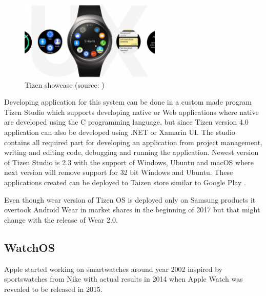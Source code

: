 \begin{figure}[H]
	\begin{centering}
		\includegraphics[width=0.6\textwidth]{img/tizen}
		\par\end{centering}
	\caption{Tizen showcase (source: \cite{NFFAWSW})\label{fig:Tizen}}
	\label{fig05c04}
\end{figure}

Developing application for this system can be done in a custom made program Tizen Studio which supports developing native or Web applications where native are developed using the C programming language, but since Tizen version 4.0 application can also be developed using .NET or Xamarin UI. The studio contains all required part for developing an application from project management, writing and editing code, debugging and running the application. Newest version of Tizen Studio is 2.3 with the support of Windows, Ubuntu and macOS where next version will remove support for 32 bit Windows and Ubuntu. These applications created can be deployed to Taizen store similar to Google Play \cite{TizenDev}.

Even though wear version of Tizen OS is deployed only on Samsung products it overtook Android Wear in market shares in the beginning of 2017 but that might change with the release of Wear 2.0. 

\subsection{WatchOS}\label{sec:WatchOS}
Apple started working on smartwatches around year 2002 inspired by sportswatches from Nike with actual results in 2014 when Apple Watch was revealed to be released in 2015.
